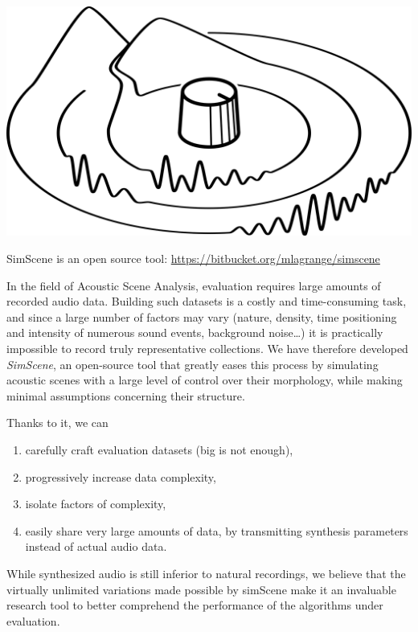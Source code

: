 \documentclass[a4paper,fleqn]{tufte-handout}
\begin{document}
\begin{marginfigure}
\begin{center}
\includegraphics[width=\textwidth]{figures/simscene} 
\end{center}
\caption{\label{fig:simScene} SimScene is an open source tool: \url{https://bitbucket.org/mlagrange/simscene}}
\end{marginfigure}

In the field of Acoustic Scene Analysis, evaluation requires large amounts of recorded audio data. Building such datasets is a costly and time-consuming task, and since a large number of factors may vary (nature, density, time positioning and intensity of numerous sound events, background noise\ldots{})
it is practically impossible to record truly representative collections. We have therefore developed \emph{SimScene}, an open-source tool that greatly eases this process by simulating acoustic scenes with a large level of control over their morphology, while making minimal assumptions concerning their structure.

Thanks to it, we can
\begin{enumerate}
\itemsep-.2em 
\item carefully craft evaluation datasets (big is not enough),
\item progressively increase data complexity,
\item isolate factors of complexity,
\item easily share very large amounts of data, by transmitting synthesis parameters instead of actual audio data.
\end{enumerate}

While synthesized audio is still inferior to natural recordings, we believe that the virtually unlimited variations made possible by simScene make it an invaluable research tool to better comprehend the performance of the algorithms under evaluation\cite{lagrange:hal-01111381}.
\end{document}
